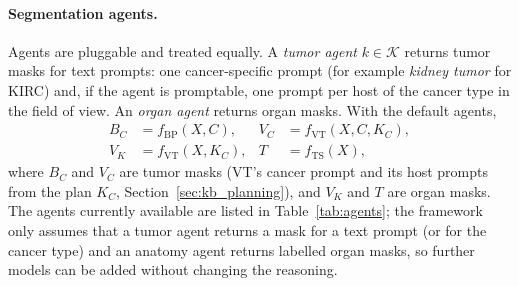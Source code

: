 \documentclass[fleqn,10pt]{olplainarticle}
\begin{document}
\paragraph{Segmentation agents.}
Agents are pluggable and treated equally. A \emph{tumor agent} $k\in\mathcal{K}$ returns tumor masks for text prompts:
one cancer-specific prompt (for example \emph{kidney tumor} for KIRC) and, if the agent is promptable, one prompt per host
of the cancer type in the field of view. An \emph{organ agent} returns organ masks. With the default agents,
\begin{equation}
\label{eq:agents}
\begin{aligned}
B_C&=f_{\mathrm{BP}}(X,C), & V_C&=f_{\mathrm{VT}}(X,C,K_C),\\
V_K&=f_{\mathrm{VT}}(X,K_C), & T&=f_{\mathrm{TS}}(X),
\end{aligned}
\end{equation}
where $B_C$ and $V_C$ are tumor masks (VT's cancer prompt and its host prompts from the plan $K_C$,
Section~\ref{sec:kb_planning}), and $V_K$ and $T$ are organ masks. The agents currently available are listed in Table~\ref{tab:agents}; the
framework only assumes that a tumor agent returns a mask for a text prompt (or for the cancer type) and an anatomy agent
returns labelled organ masks, so further models can be added without changing the reasoning.
\end{document}
